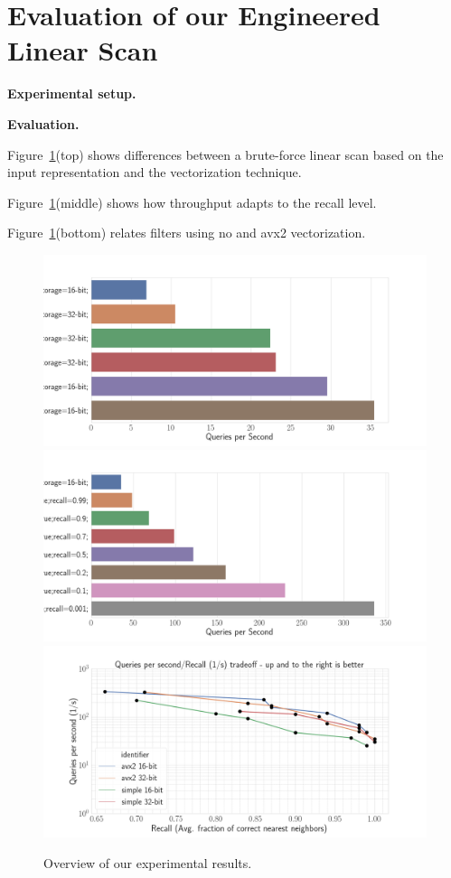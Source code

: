 \documentclass{llncs}
\newcommand{\myparagraph}[1]{\noindent \textbf{#1}}
\begin{document}
\section{Evaluation of our Engineered Linear Scan}
\label{app:linear:scan}

\myparagraph{Experimental setup.}

\myparagraph{Evaluation.}

Figure~\ref{plot:eval}(top) shows differences between a brute-force linear scan based on the input representation and the vectorization technique. 

Figure~\ref{plot:eval}(middle) shows how throughput adapts to the recall level. 

Figure~\ref{plot:eval}(bottom) relates filters using no and avx2 vectorization.

\begin{figure}
  \includegraphics[width=\textwidth]{figs/linearscan_no_filter.png}
  \includegraphics[width=\textwidth]{figs/16bit_filter.png}
  \includegraphics[width=\textwidth]{figs/avx2_16vs32bit.png}
  \caption{Overview of our experimental results.}
  \label{plot:eval}
\end{figure}
\end{document}
